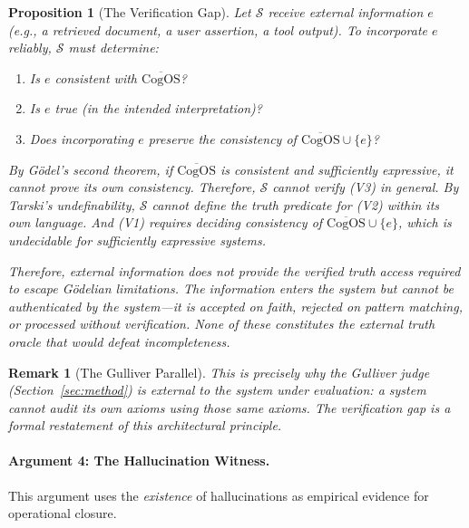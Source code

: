 \documentclass[11pt]{article}
\newtheorem{proposition}{Proposition}
\newtheorem{remark}{Remark}
\newcommand{\CogOS}{\text{CogOS}}
\begin{document}
\begin{proposition}[The Verification Gap]
\label{prop:verification-gap}
Let $\mathcal{S}$ receive external information $e$ (e.g., a retrieved
document, a user assertion, a tool output). To incorporate $e$ reliably,
$\mathcal{S}$ must determine:
\begin{enumerate}
\item[(V1)] Is $e$ consistent with $\overline{\CogOS}$?
\item[(V2)] Is $e$ true (in the intended interpretation)?
\item[(V3)] Does incorporating $e$ preserve the consistency of
      $\overline{\CogOS} \cup \{e\}$?
\end{enumerate}
By G\"{o}del's second theorem, if $\overline{\CogOS}$ is consistent and
sufficiently expressive, it cannot prove its own consistency. Therefore,
$\mathcal{S}$ cannot verify (V3) in general. By Tarski's undefinability,
$\mathcal{S}$ cannot define the truth predicate for (V2) within its own
language. And (V1) requires deciding consistency of
$\overline{\CogOS} \cup \{e\}$, which is undecidable for sufficiently
expressive systems.

Therefore, external information does not provide the \textit{verified truth
access} required to escape G\"{o}delian limitations. The information enters the
system but cannot be authenticated by the system---it is accepted on faith,
rejected on pattern matching, or processed without verification. None of
these constitutes the external truth oracle that would defeat incompleteness.
\end{proposition}

\begin{remark}[The Gulliver Parallel]
This is precisely why the Gulliver judge (Section~\ref{sec:method}) is
\textit{external} to the system under evaluation: a system cannot audit its
own axioms using those same axioms. The verification gap is a formal
restatement of this architectural principle.
\end{remark}

\paragraph{Argument 4: The Hallucination Witness.}

This argument uses the \textit{existence} of hallucinations as empirical
evidence for operational closure.
\end{document}
